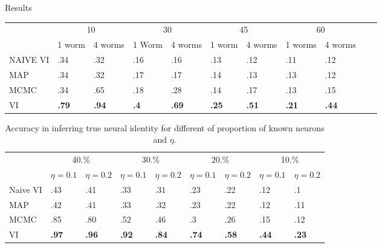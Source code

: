 \documentclass[final]{beamer}
\begin{document}
\begin{frame}[allowframebreaks]
\begin{minipage}[htp][1\textheight][t]{\textwidth}
\begin{columns}[t]
\begin{column}{.5\linewidth}
\begin{block}{Results}
\begin{table}[t]
   \centering
  \begin{tabular}{lllllllllll}
    & \multicolumn{2}{c}{10} & \multicolumn{2}{c}{30} &   \multicolumn{2}{c}{45} & \multicolumn{2}{c}{60} \\
    \cmidrule(lr){2-3} \cmidrule(lr){4-5} \cmidrule(lr){6-7} \cmidrule(lr){8-9}
& 1 worm & 4 worms & 1 Worm & 4 worms & 1 worm & 4 worms & 1 worms & 4 worms \\
    \midrule 
    NAIVE VI &.34 & .32 & .16 & .16 & .13 & .12 & .11 & .12 \\
   MAP   & .34 & .32  &.17 &.17& .14 & .13 & .13 & .12 \\
    MCMC   & .34 & .65  &.18 &.28& .14 & .17 & .13 & .15 \\
  
    VI   & \textbf{.79} & \textbf{.94} & \textbf{.4} & \textbf{.69} & \textbf{.25}&  \textbf{.51} & \textbf{.21} & \textbf{.44}\\
 
    \bottomrule
  \end{tabular}
\end{table}


\begin{table}[t]
  \caption{Accuracy in inferring true neural identity for different of
    proportion of known neurons and $\eta$.
  }
   \label{table:celegans}
   \centering
   \begin{tabular}{lllllllll}
    & \multicolumn{2}{c}{40.\%} & \multicolumn{2}{c}{30.\%} & \multicolumn{2}{c}{20.\%} & \multicolumn{2}{c}{10.\%}\\
    \cmidrule(lr){2-3} \cmidrule(lr){4-5} \cmidrule(lr){6-7} \cmidrule(lr){8-9}
    & $\eta=0.1$ & $\eta=0.2$ & $\eta=0.1$ & $\eta=0.2$  & $\eta=0.1$ & $\eta=0.2$  & $\eta=0.1$ & $\eta=0.2$ \\
    \midrule 
    Naive VI & .43 & .41 & .33 & .31 & .23 & .22 & .12 & .1 \\
    MAP & .42 & .41  &.33 &.32& .23 & .22 & .12 & .11 \\
    MCMC   & .85 & .80  &.52 &.46& .3 & .26 & .15 & .12 \\
    VI   & \textbf{.97} & \textbf{.96} & \textbf{.92} & \textbf{.84} & \textbf{.74} & \textbf{.58} & \textbf{.44} & \textbf{.23} \\
              \bottomrule
   \end{tabular}
\end{table}
\end{block}


\end{column}
\end{columns}
\end{minipage}
\end{frame}
\end{document}
